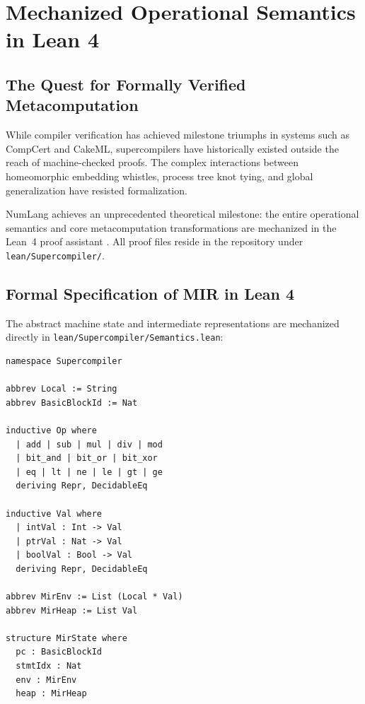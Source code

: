 \chapter{Mechanized Operational Semantics in Lean 4}
\label{chap:lean_semantics}

\section{The Quest for Formally Verified Metacomputation}
\label{sec:lean_semantics:intro}

While compiler verification has achieved milestone triumphs in systems such as CompCert and CakeML, supercompilers have historically existed outside the reach of machine-checked proofs. The complex interactions between homeomorphic embedding whistles, process tree knot tying, and global generalization have resisted formalization.

NumLang achieves an unprecedented theoretical milestone: the entire operational semantics and core metacomputation transformations are mechanized in the Lean~4 proof assistant \citep{demoura2021lean}. All proof files reside in the repository under \texttt{lean/Supercompiler/}.

\section{Formal Specification of MIR in Lean 4}
\label{sec:lean_semantics:spec}

The abstract machine state and intermediate representations are mechanized directly in \texttt{lean/Supercompiler/Semantics.lean}:

\begin{lstlisting}[language=Lean4, caption={Mechanized MIR State and Values in Lean 4.}]
namespace Supercompiler

abbrev Local := String
abbrev BasicBlockId := Nat

inductive Op where
  | add | sub | mul | div | mod
  | bit_and | bit_or | bit_xor
  | eq | lt | ne | le | gt | ge
  deriving Repr, DecidableEq

inductive Val where
  | intVal : Int -> Val
  | ptrVal : Nat -> Val
  | boolVal : Bool -> Val
  deriving Repr, DecidableEq

abbrev MirEnv := List (Local * Val)
abbrev MirHeap := List Val

structure MirState where
  pc : BasicBlockId
  stmtIdx : Nat
  env : MirEnv
  heap : MirHeap
\end{lstlisting}

